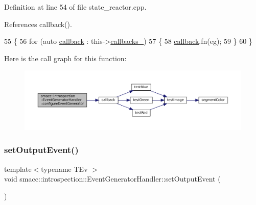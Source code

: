 Definition at line 54 of file state\+\_\+reactor.\+cpp.



References callback().


\begin{DoxyCode}
55 \{
56     \textcolor{keywordflow}{for} (\textcolor{keyword}{auto} \hyperlink{sm__ridgeback__barrel__search__1_2servers_2opencv__perception__node_2opencv__perception__node_8cpp_a050e697bd654facce10ea3f6549669b3}{callback} : this->\hyperlink{classsmacc_1_1introspection_1_1EventGeneratorHandler_ad706c79796082e497b5cfe65eb06eed9}{callbacks\_})
57     \{
58         \hyperlink{sm__ridgeback__barrel__search__1_2servers_2opencv__perception__node_2opencv__perception__node_8cpp_a050e697bd654facce10ea3f6549669b3}{callback}.fn(eg);
59     \}
60 \}
\end{DoxyCode}
Here is the call graph for this function\+:
\nopagebreak
\begin{figure}[H]
\begin{center}
\leavevmode
\includegraphics[width=350pt]{classsmacc_1_1introspection_1_1EventGeneratorHandler_a2972060b50361e1c0d8fff8dff79385a_cgraph}
\end{center}
\end{figure}
\mbox{\label{classsmacc_1_1introspection_1_1EventGeneratorHandler_a7200f1d3a2a7a919aeaf801ee188264c}} 
\subsubsection{\texorpdfstring{set\+Output\+Event()}{setOutputEvent()}}
{\footnotesize\ttfamily template$<$typename T\+Ev $>$ \\
void smacc\+::introspection\+::\+Event\+Generator\+Handler\+::set\+Output\+Event (\begin{DoxyParamCaption}{ }\end{DoxyParamCaption})}



